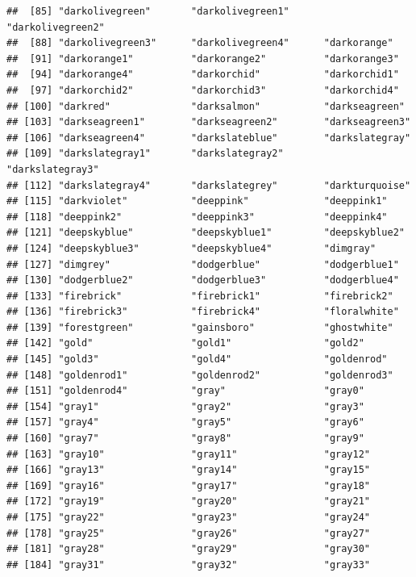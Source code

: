 \documentclass[]{book}
\begin{document}
\begin{verbatim}
##  [85] "darkolivegreen"       "darkolivegreen1"      "darkolivegreen2"     
##  [88] "darkolivegreen3"      "darkolivegreen4"      "darkorange"          
##  [91] "darkorange1"          "darkorange2"          "darkorange3"         
##  [94] "darkorange4"          "darkorchid"           "darkorchid1"         
##  [97] "darkorchid2"          "darkorchid3"          "darkorchid4"         
## [100] "darkred"              "darksalmon"           "darkseagreen"        
## [103] "darkseagreen1"        "darkseagreen2"        "darkseagreen3"       
## [106] "darkseagreen4"        "darkslateblue"        "darkslategray"       
## [109] "darkslategray1"       "darkslategray2"       "darkslategray3"      
## [112] "darkslategray4"       "darkslategrey"        "darkturquoise"       
## [115] "darkviolet"           "deeppink"             "deeppink1"           
## [118] "deeppink2"            "deeppink3"            "deeppink4"           
## [121] "deepskyblue"          "deepskyblue1"         "deepskyblue2"        
## [124] "deepskyblue3"         "deepskyblue4"         "dimgray"             
## [127] "dimgrey"              "dodgerblue"           "dodgerblue1"         
## [130] "dodgerblue2"          "dodgerblue3"          "dodgerblue4"         
## [133] "firebrick"            "firebrick1"           "firebrick2"          
## [136] "firebrick3"           "firebrick4"           "floralwhite"         
## [139] "forestgreen"          "gainsboro"            "ghostwhite"          
## [142] "gold"                 "gold1"                "gold2"               
## [145] "gold3"                "gold4"                "goldenrod"           
## [148] "goldenrod1"           "goldenrod2"           "goldenrod3"          
## [151] "goldenrod4"           "gray"                 "gray0"               
## [154] "gray1"                "gray2"                "gray3"               
## [157] "gray4"                "gray5"                "gray6"               
## [160] "gray7"                "gray8"                "gray9"               
## [163] "gray10"               "gray11"               "gray12"              
## [166] "gray13"               "gray14"               "gray15"              
## [169] "gray16"               "gray17"               "gray18"              
## [172] "gray19"               "gray20"               "gray21"              
## [175] "gray22"               "gray23"               "gray24"              
## [178] "gray25"               "gray26"               "gray27"              
## [181] "gray28"               "gray29"               "gray30"              
## [184] "gray31"               "gray32"               "gray33"              

\end{verbatim}
\end{document}
